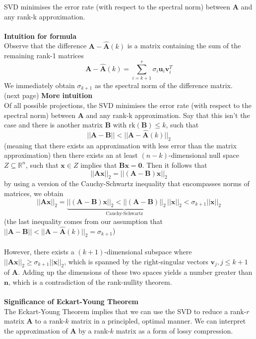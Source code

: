 \documentclass{report}
\begin{document}
SVD minimises the error rate (with respect to the spectral norm) between $\bm{A}$ and any rank-k approximation.\\
\vspace{1mm}\\
\textbf{Intuition for formula}\\
Observe that the difference $\bm{A}-\widehat{\bm{A}}(k)$ is a matrix containing the sum of the remaining rank-1 
matrices
\begin{equation*}
\bm{A}-\widehat{\bm{A}}(k)=\sum^r_{i=k+1}\sigma_i\bm{u}_i\bm{v}_i^T
\end{equation*}
We immediately obtain $\sigma_{k+1}$ as the spectral norm of the difference matrix.\\
(next page)
\newpage
\noindent\textbf{More intuition}\\
Of all possible projections, the SVD minimises the error rate (with respect to the spectral norm)
between $\bm{A}$ and any rank-k approximation. Say that this isn't the case and there is 
another matrix $\bm{B}$ with $\text{rk}(\bm{B})\leq k$, such that
\begin{equation*}
||\bm{A}-\bm{B}||<||\bm{A}-\widehat{\bm{A}}(k)||_2
\end{equation*}
(meaning that there exists an approximation with less error than the matrix approximation) then there exists 
an at least $(n-k)$-dimensional null space $Z\subseteq\mathbb{R}^n$, such that $\bm{x}\in Z$ implies that
$\bm{Bx}=\bm{0}$. Then it follows that
\begin{equation*}
||\bm{Ax}||_2=||(\bm{A}-\bm{B})\bm{x}||_2
\end{equation*}
by using a version of the Cauchy-Schwartz inequality that encompasses norms of matrices, we obtain
\begin{equation*}
||\bm{Ax}||_2=\underbrace{||(\bm{A}-\bm{B})\bm{x}||_2
<||(\bm{A}-\bm{B})||_2\,||\bm{x}||_2}_{\text{Cauchy-Schwartz}}<\sigma_{k+1}||\bm{x}||_2
\end{equation*}
(the last inequality comes from our assumption that 
$||\bm{A}-\bm{B}||<||\bm{A}-\widehat{\bm{A}}(k)||_2=\sigma_{k+1}$)\\
\vspace{1mm}\\
However, there exists a $(k+1)$-dimensional subspace where
$||\bm{Ax}||_2\geq\sigma_{k+1}||\bm{x}||_2$, which is 
spanned by the right-singular vectors $\bm{v}_j,j\leq
k+1$ of $\bm{A}$. Adding up the dimensions of these two spaces yields a number greater than $\bm{n}$, which is a 
contradiction of the rank-nullity theorem.\\
\vspace{1mm}\\
\textbf{Significance of Eckart-Young Theorem}\\
The Eckart-Young Theorem implies that we can use the SVD to reduce a rank-$r$ matrix $\bm{A}$ to a rank-$k$ matrix
in a principled, optimal manner. We can interpret the approximation of $\bm{A}$ by a rank-$k$ matrix as a form of
lossy compression.
\newpage
\end{document}
